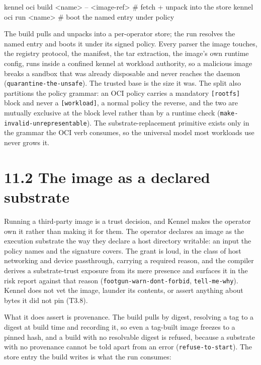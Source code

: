 \begin{kennelcode}
kennel oci build <name> -- <image-ref>   # fetch + unpack into the store
kennel oci run   <name>                  # boot the named entry under policy
\end{kennelcode}

The build pulls and unpacks into a per-operator store; the run resolves
the named entry and boots it under its signed policy. Every parser the
image touches, the registry protocol, the manifest, the tar extraction,
the image's own runtime config, runs inside a confined kennel at
workload authority, so a malicious image breaks a sandbox that was
already disposable and never reaches the daemon
(\texttt{quarantine-the-unsafe}). The trusted base is the size it was.
The split also partitions the policy grammar: an OCI policy carries a
mandatory \texttt{{[}rootfs{]}} block and never a
\texttt{{[}workload{]}}, a normal policy the reverse, and the two are
mutually exclusive at the block level rather than by a runtime check
(\texttt{make-invalid-unrepresentable}). The substrate-replacement
primitive exists only in the grammar the OCI verb consumes, so the
universal model most workloads use never grows it.

\hypertarget{the-image-as-a-declared-substrate}{%
\section{11.2 The image as a declared
substrate}\label{the-image-as-a-declared-substrate}}

Running a third-party image is a trust decision, and Kennel makes the
operator own it rather than making it for them. The operator declares an
image as the execution substrate the way they declare a host directory
writable: an input the policy names and the signature covers. The grant
is loud, in the class of host networking and device passthrough,
carrying a required reason, and the compiler derives a substrate-trust
exposure from its mere presence and surfaces it in the risk report
against that reason (\texttt{footgun-warn-dont-forbid},
\texttt{tell-me-why}). Kennel does not vet the image, launder its
contents, or assert anything about bytes it did not pin (T3.8).

What it does assert is provenance. The build pulls by digest, resolving
a tag to a digest at build time and recording it, so even a tag-built
image freezes to a pinned hash, and a build with no resolvable digest is
refused, because a substrate with no provenance cannot be told apart
from an error (\texttt{refuse-to-start}). The store entry the build
writes is what the run consumes:


